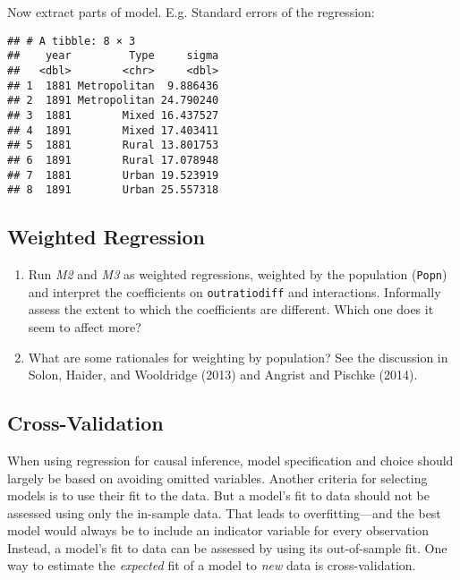 \documentclass[]{article}
\newenvironment{Shaded}{\begin{snugshade}}{\end{snugshade}}
\newcommand{\KeywordTok}[1]{\textcolor[rgb]{0.13,0.29,0.53}{\textbf{#1}}}
\newcommand{\DataTypeTok}[1]{\textcolor[rgb]{0.13,0.29,0.53}{#1}}
\newcommand{\StringTok}[1]{\textcolor[rgb]{0.31,0.60,0.02}{#1}}
\newcommand{\ControlFlowTok}[1]{\textcolor[rgb]{0.13,0.29,0.53}{\textbf{#1}}}
\newcommand{\OperatorTok}[1]{\textcolor[rgb]{0.81,0.36,0.00}{\textbf{#1}}}
\newcommand{\NormalTok}[1]{#1}
\providecommand{\tightlist}{%
  \setlength{\itemsep}{0pt}\setlength{\parskip}{0pt}}
\begin{document}
Now extract parts of model. E.g. Standard errors of the regression:

\begin{Shaded}
\end{Shaded}

\begin{verbatim}
## # A tibble: 8 × 3
##    year         Type     sigma
##   <dbl>        <chr>     <dbl>
## 1  1881 Metropolitan  9.886436
## 2  1891 Metropolitan 24.790240
## 3  1881        Mixed 16.437527
## 4  1891        Mixed 17.403411
## 5  1881        Rural 13.801753
## 6  1891        Rural 17.078948
## 7  1881        Urban 19.523919
## 8  1891        Urban 25.557318
\end{verbatim}

\subsection{Weighted Regression}\label{weighted-regression}

\begin{enumerate}
\def\labelenumi{\arabic{enumi}.}
\tightlist
\item
  Run \emph{M2} and \emph{M3} as weighted regressions, weighted by the
  population (\texttt{Popn}) and interpret the coefficients on
  \texttt{outratiodiff} and interactions. Informally assess the extent
  to which the coefficients are different. Which one does it seem to
  affect more?
\item
  What are some rationales for weighting by population? See the
  discussion in Solon, Haider, and Wooldridge (2013) and Angrist and
  Pischke (2014).
\end{enumerate}

\subsection{Cross-Validation}\label{cross-validation}

When using regression for causal inference, model specification and
choice should largely be based on avoiding omitted variables. Another
criteria for selecting models is to use their fit to the data. But a
model's fit to data should not be assessed using only the in-sample
data. That leads to overfitting---and the best model would always be to
include an indicator variable for every observation Instead, a model's
fit to data can be assessed by using its out-of-sample fit. One way to
estimate the \emph{expected} fit of a model to \emph{new} data is
cross-validation.
\end{document}
